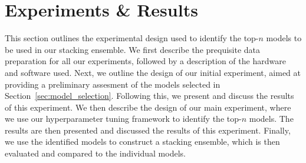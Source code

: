 \section{Experiments \& Results}\label{sec:methodology}
This section outlines the experimental design used to identify the top-$n$ models to be used in our stacking ensemble.
We first describe the prequisite data preparation for all our experiments, followed by a description of the hardware and software used.
Next, we outline the design of our initial experiment, aimed at providing a preliminary assesment of the models selected in Section~\ref{sec:model_selection}.
Following this, we present and discuss the results of this experiment.
We then describe the design of our main experiment, where we use our hyperparameter tuning framework to identify the top-$n$ models.
The results are then presented and discussed the results of this experiment.
Finally, we use the identified models to construct a stacking ensemble, which is then evaluated and compared to the individual models.






